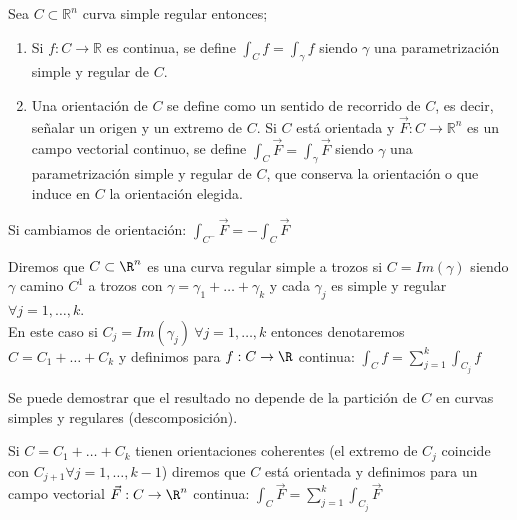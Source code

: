 \begin{definición} 
Sea $C \subset \mathbb{R}^n$ curva simple regular entonces;
\begin{enumerate}
    \item Si $f: C \to \mathbb{R}$ es continua, se define $\int_{C} f = \int_{\gamma} f$
          siendo $\gamma$ una parametrización simple y regular de $C$.
    \item Una orientación de $C$ se define como un sentido de recorrido de $C$, es decir,
          señalar un origen y un extremo de $C$. Si $C$ está orientada y $\vec{F}: C \to
              \mathbb{R}^n$ es un campo vectorial continuo, se define $\int_{C} \vec{F} =
              \int_{\gamma} \vec{F}$ siendo $\gamma$ una parametrización simple y regular de
          $C$, que conserva la orientación o que induce en $C$ la orientación elegida.
\end{enumerate}
\end{definición}

\begin{observación}
Si cambiamos de orientación: $\int_{C^-} \vec{F} = -\int_{C} \vec{F}$
\end{observación}

\begin{definición} 
Diremos que $C \subset \R^n $ es una curva regular simple a trozos si $C = Im(\gamma)$ siendo $\gamma$ camino $C^1$ a trozos con $\gamma = \gamma_1 + \ldots + \gamma_k$ y cada $\gamma_j$ es simple y regular $\forall j = 1, \ldots, k$.\\
En este caso si $C_j = Im(\gamma_j) \ \forall j = 1, \ldots, k$ entonces denotaremos $C = C_1 + \ldots + C_k$ y definimos para $f: C \to \R$ continua: $\int_{C} f = \sum_{j=1}^{k} \int_{C_j} f$
\end{definición}

\begin{observación}
Se puede demostrar que el resultado no depende de la partición de $C$ en curvas simples y regulares (descomposición).
\end{observación}

\begin{observación}
Si $C = C_1 + \ldots + C_k$ tienen orientaciones coherentes (el extremo de $C_j$ coincide con $C_{j+1} \forall j = 1, \ldots, k-1$) diremos que $C$ está orientada y definimos para un campo vectorial $\vec{F}: C \to \R^n$ continua: $\int_{C} \vec{F} = \sum_{j=1}^{k} \int_{C_j} \vec{F}$
\end{observación}

